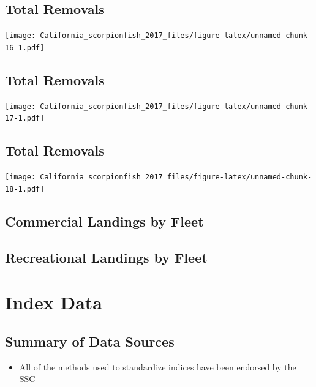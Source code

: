 \documentclass[ignorenonframetext,compress]{beamer}
\providecommand{\tightlist}{%
\setlength{\itemsep}{0pt}\setlength{\parskip}{0pt}}
\begin{document}
\subsection{Total Removals}\label{total-removals}

\texttt{[image: California\_scorpionfish\_2017\_files/figure-latex/unnamed-chunk-16-1.pdf]}

\subsection{Total Removals}\label{total-removals-1}

\texttt{[image: California\_scorpionfish\_2017\_files/figure-latex/unnamed-chunk-17-1.pdf]}

\subsection{Total Removals}\label{total-removals-2}

\texttt{[image: California\_scorpionfish\_2017\_files/figure-latex/unnamed-chunk-18-1.pdf]}

\subsection{Commercial Landings by
Fleet}\label{commercial-landings-by-fleet}

\subsection{Recreational Landings by
Fleet}\label{recreational-landings-by-fleet}

\section{Index Data}\label{index-data}

\subsection{Summary of Data Sources}\label{summary-of-data-sources}

\begin{itemize}
\tightlist
\item
  All of the methods used to standardize indices have been endorsed by
  the SSC
\end{itemize}
\end{document}

